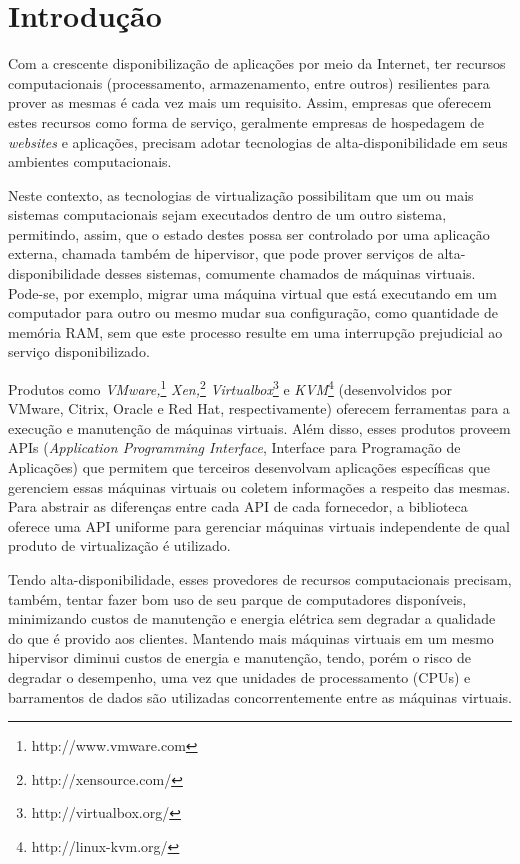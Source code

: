 %
%

\chapter{Introdução}

Com a crescente disponibilização de aplicações por meio da Internet, ter
recursos computacionais (processamento, armazenamento, entre outros)
resilientes para prover as mesmas é cada vez mais um requisito. Assim,
empresas que oferecem estes recursos como forma de serviço, geralmente
empresas de hospedagem de \emph{websites} e aplicações, precisam adotar
tecnologias de alta-disponibilidade em seus ambientes computacionais.

Neste contexto, as tecnologias de virtualização possibilitam que um ou mais
sistemas computacionais sejam executados dentro de um outro sistema,
permitindo, assim, que o estado destes possa ser controlado por uma aplicação
externa, chamada também de hipervisor, que pode prover serviços de
alta-disponibilidade desses sistemas, comumente chamados de máquinas
virtuais. Pode-se, por exemplo, migrar uma máquina virtual que está
executando em um computador para outro ou mesmo mudar sua configuração,
como quantidade de memória RAM, sem que este processo resulte em uma
interrupção prejudicial ao serviço disponibilizado.

Produtos como \emph{VMware,}\footnote{http://www.vmware.com}
\emph{Xen,}\footnote{http://xensource.com/}
\emph{Virtualbox}\footnote{http://virtualbox.org/} e
\emph{KVM}\footnote{http://linux-kvm.org/} (desenvolvidos por VMware,
Citrix, Oracle e Red Hat, respectivamente) oferecem ferramentas para a
execução e manutenção de máquinas virtuais. Além disso, esses produtos
proveem APIs (\emph{Application Programming Interface}, Interface para Programação
de Aplicações) que permitem que terceiros desenvolvam aplicações
específicas que gerenciem essas máquinas virtuais ou coletem informações a
respeito das mesmas. Para abstrair as diferenças entre cada API de cada
fornecedor, a biblioteca \libvirt{} oferece uma API uniforme para gerenciar
máquinas virtuais independente de qual produto de virtualização é
utilizado.

Tendo alta-disponibilidade, esses provedores de recursos computacionais
precisam, também, tentar fazer bom uso de seu parque de computadores
disponíveis, minimizando custos de manutenção e energia elétrica
sem degradar a qualidade do que é provido aos clientes. Mantendo mais
máquinas virtuais em um mesmo hipervisor diminui custos de energia e
manutenção, tendo, porém o risco de degradar o desempenho, uma vez que
unidades de processamento (CPUs) e barramentos de dados são utilizadas
concorrentemente entre as máquinas virtuais.

